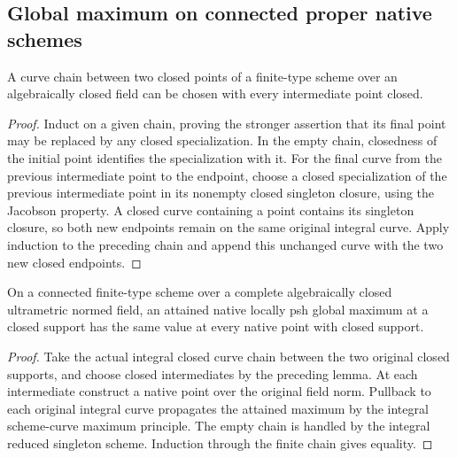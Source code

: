 \subsection{Global maximum on connected proper native schemes}

\begin{lemma}
\label{lem:fc-closed-plain-curve-chain}
\leanok
A curve chain between two closed points of a finite-type scheme over an
algebraically closed field can be chosen with every intermediate point closed.
\end{lemma}
\begin{proof}
Induct on a given chain, proving the stronger assertion that its final point
may be replaced by any closed specialization. In the empty chain, closedness
of the initial point identifies the specialization with it. For the final
curve from the previous intermediate point to the endpoint, choose a closed
specialization of the previous intermediate point in its nonempty closed
singleton closure, using the Jacobson property. A closed curve containing a
point contains its singleton closure, so both new endpoints remain on the same
original integral curve. Apply induction to the preceding chain and append
this unchanged curve with the two new closed endpoints.
\end{proof}

\begin{lemma}
\label{lem:fc-finite-type-closed-support-maximum}
\leanok
{}
On a connected finite-type scheme over a complete algebraically closed
ultrametric normed field, an attained native locally psh global maximum at a
closed support has the same value at every native point with closed support.
\end{lemma}
\begin{proof}
Take the actual integral closed curve chain between the two original closed
supports, and choose closed intermediates by the preceding lemma. At each
intermediate construct a native point over the original field norm. Pullback
to each original integral curve propagates the attained maximum by the integral
scheme-curve maximum principle. The empty chain is handled by the integral
reduced singleton scheme. Induction through the finite chain gives equality.
\end{proof}

